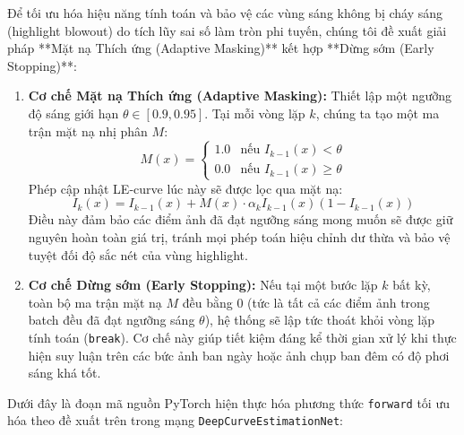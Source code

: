 \documentclass[a4paper]{article}
\begin{document}
Để tối ưu hóa hiệu năng tính toán và bảo vệ các vùng sáng không bị cháy sáng (highlight blowout) do tích lũy sai số làm tròn phi tuyến, chúng tôi đề xuất giải pháp **Mặt nạ Thích ứng (Adaptive Masking)** kết hợp **Dừng sớm (Early Stopping)**:
\begin{enumerate}
    \item \textbf{Cơ chế Mặt nạ Thích ứng (Adaptive Masking):} Thiết lập một ngưỡng độ sáng giới hạn $\theta \in [0.9, 0.95]$. Tại mỗi vòng lặp $k$, chúng ta tạo một ma trận mặt nạ nhị phân $M$:
    \begin{equation}
        M(x) = \begin{cases} 
            1.0 & \text{nếu } I_{k-1}(x) < \theta \\ 
            0.0 & \text{nếu } I_{k-1}(x) \geq \theta 
        \end{cases}
    \end{equation}
    Phép cập nhật LE-curve lúc này sẽ được lọc qua mặt nạ:
    \begin{equation}
        I_k(x) = I_{k-1}(x) + M(x) \cdot \alpha_k I_{k-1}(x)(1 - I_{k-1}(x))
    \end{equation}
    Điều này đảm bảo các điểm ảnh đã đạt ngưỡng sáng mong muốn sẽ được giữ nguyên hoàn toàn giá trị, tránh mọi phép toán hiệu chỉnh dư thừa và bảo vệ tuyệt đối độ sắc nét của vùng highlight.
    \item \textbf{Cơ chế Dừng sớm (Early Stopping):} Nếu tại một bước lặp $k$ bất kỳ, toàn bộ ma trận mặt nạ $M$ đều bằng 0 (tức là tất cả các điểm ảnh trong batch đều đã đạt ngưỡng sáng $\theta$), hệ thống sẽ lập tức thoát khỏi vòng lặp tính toán (\texttt{break}). Cơ chế này giúp tiết kiệm đáng kể thời gian xử lý khi thực hiện suy luận trên các bức ảnh ban ngày hoặc ảnh chụp ban đêm có độ phơi sáng khá tốt.
\end{enumerate}

\noindent Dưới đây là đoạn mã nguồn PyTorch hiện thực hóa phương thức \texttt{forward} tối ưu hóa theo đề xuất trên trong mạng \texttt{DeepCurveEstimationNet}:
\end{document}

